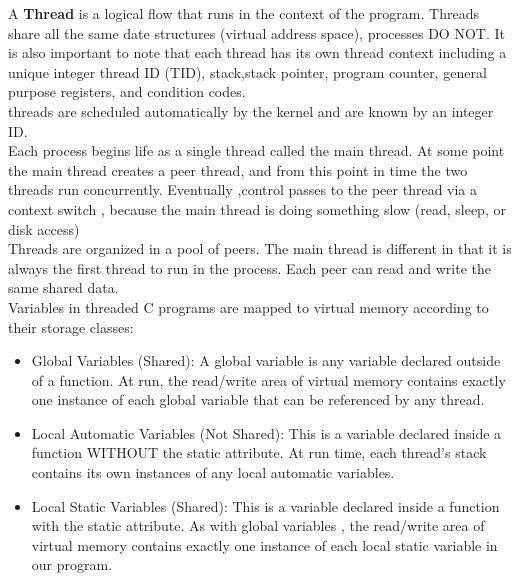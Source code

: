 

A {\bf Thread} is a logical flow that runs in the context of the program.  Threads share all the same date structures (virtual address space), processes DO NOT.  It is also important to note that each thread has its own thread context including a unique integer thread ID (TID), stack,stack pointer, program counter, general purpose registers, and condition codes.\\

threads  are scheduled automatically by the kernel and are known by an integer ID.\\
Each process begins life as a single thread called the main thread.  At some point the main thread creates a peer thread, and from this point in time the two threads run concurrently.  Eventually ,control passes to the peer thread via a context switch , because the main thread is doing something slow (read, sleep, or disk access)\\

Threads are organized in a pool of peers.  The main thread is different in that it is always the first thread to run in the process.  Each peer can read and write the same shared data.\\

Variables in threaded C programs are mapped to virtual memory according to their storage classes:
\begin{itemize}
\item Global Variables (Shared):  A global variable is any variable declared outside of a function.  At run, the read/write area of virtual memory contains exactly one instance of each global variable that can be referenced by any thread.
\item Local Automatic Variables (Not Shared): This is a variable declared inside a function WITHOUT the static attribute.  At run time, each thread's stack contains its own instances of any local automatic variables.
\item Local Static Variables (Shared):  This is a variable declared inside a function with the static attribute.  As with global variables , the read/write area of virtual memory contains exactly one instance of each local static variable in our program.
\end{itemize}


